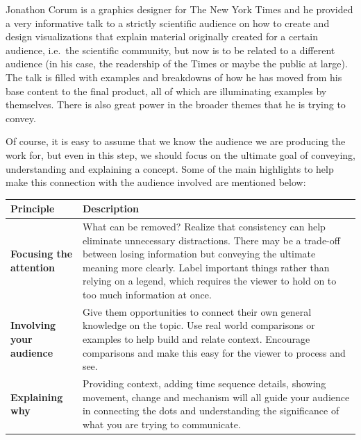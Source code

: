 \documentclass[]{book}
\begin{document}
Jonathon Corum is a graphics designer for The New York Times and he provided a very informative talk to a strictly scientific audience on how to create and design visualizations that explain material originally created for a certain audience, i.e.~the scientific community, but now is to be related to a different audience (in his case, the readership of the Times or maybe the public at large). The talk is filled with examples and breakdowns of how he has moved from his base content to the final product, all of which are illuminating examples by themselves. There is also great power in the broader themes that he is trying to convey.

Of course, it is easy to assume that we know the audience we are producing the work for, but even in this step, we should focus on the ultimate goal of conveying, understanding and explaining a concept. Some of the main highlights to help make this connection with the audience involved are mentioned below:

\begin{longtable}[]{@{}ll@{}}
\toprule
\begin{minipage}[b]{0.19\columnwidth}\raggedright
\textbf{Principle}\strut
\end{minipage} & \begin{minipage}[b]{0.75\columnwidth}\raggedright
\textbf{Description}\strut
\end{minipage}\tabularnewline
\midrule
\endhead
\begin{minipage}[t]{0.19\columnwidth}\raggedright
\textbf{Focusing the attention}\strut
\end{minipage} & \begin{minipage}[t]{0.75\columnwidth}\raggedright
What can be removed? Realize that consistency can help eliminate unnecessary distractions. There may be a trade-off between losing information but conveying the ultimate meaning more clearly. Label important things rather than relying on a legend, which requires the viewer to hold on to too much information at once.\strut
\end{minipage}\tabularnewline
\begin{minipage}[t]{0.19\columnwidth}\raggedright
\textbf{Involving your audience}\strut
\end{minipage} & \begin{minipage}[t]{0.75\columnwidth}\raggedright
Give them opportunities to connect their own general knowledge on the topic. Use real world comparisons or examples to help build and relate context. Encourage comparisons and make this easy for the viewer to process and see.\strut
\end{minipage}\tabularnewline
\begin{minipage}[t]{0.19\columnwidth}\raggedright
\textbf{Explaining why}\strut
\end{minipage} & \begin{minipage}[t]{0.75\columnwidth}\raggedright
Providing context, adding time sequence details, showing movement, change and mechanism will all guide your audience in connecting the dots and understanding the significance of what you are trying to communicate.\strut
\end{minipage}\tabularnewline
\bottomrule
\end{longtable}
\end{document}
